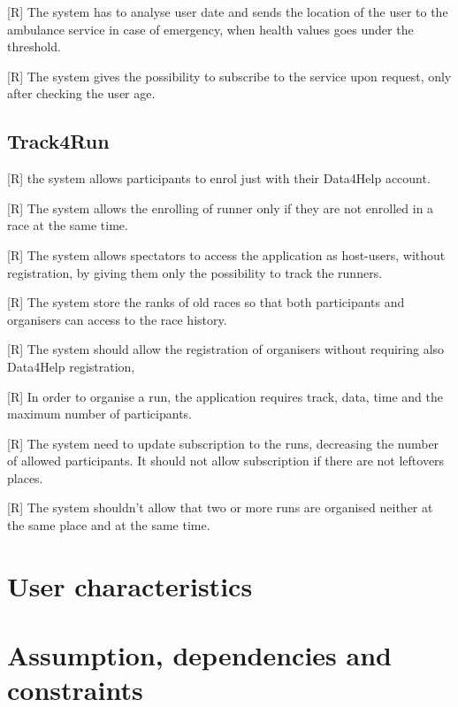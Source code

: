 [R] The system has to analyse user date and sends the location of the user to the ambulance service in case of emergency, when health values goes under the threshold.

[R] The system gives the possibility to subscribe to the service upon request, only after checking the user age.

\subsection{Track4Run }

[R] the system allows participants to enrol just with their Data4Help account.

[R] The system allows the enrolling of runner only if they are not enrolled in a race at the same time.

[R] The system allows spectators to access the application as host-users, without registration, by giving them only the possibility to track the runners.

[R] The system store the ranks of old races so that both participants and organisers can access to the race history.

[R] The system should allow the registration of organisers without requiring also Data4Help registration,

[R] In order to organise a run, the application requires track, data, time and the maximum number of participants.

[R] The system need to update subscription to the runs, decreasing the number of allowed participants. It should not allow subscription if there are not leftovers places.

[R] The system shouldn't allow that two or more runs are organised neither at the same place and at the same time.

\section{User characteristics}



\section{Assumption, dependencies and constraints}


